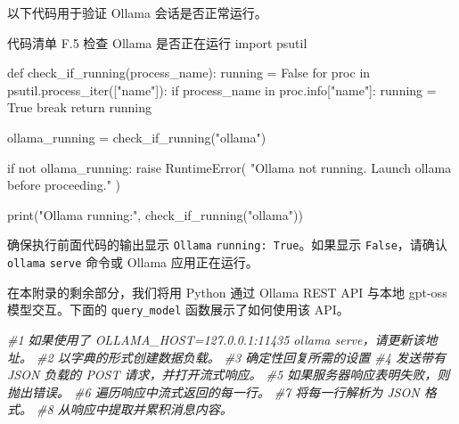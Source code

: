 以下代码用于验证 Ollama 会话是否正常运行。

\begin{codeboxt}{代码清单 F.5 检查 Ollama 是否正在运行}
import psutil

def check_if_running(process_name):
    running = False
    for proc in psutil.process_iter(["name"]):
        if process_name in proc.info["name"]:
            running = True
            break
    return running

ollama_running = check_if_running("ollama")

if not ollama_running:
    raise RuntimeError(
        "Ollama not running. Launch ollama before proceeding."
    )

print("Ollama running:", check_if_running("ollama"))
\end{codeboxt}

确保执行前面代码的输出显示 \texttt{Ollama} \texttt{running: True}。如果显示 \texttt{False}，请确认 \texttt{ollama} \texttt{serve} 命令或 Ollama 应用正在运行。

在本附录的剩余部分，我们将用 Python 通过 Ollama REST API 与本地 gpt-oss 模型交互。下面的 \texttt{query\_model} 函数展示了如何使用该 API。

{\noindent\small\textit{\#1 如果使用了 OLLAMA\_HOST=127.0.0.1:11435 ollama serve，请更新该地址。 \newline \#2 以字典的形式创建数据负载。 \newline \#3 确定性回复所需的设置 \newline \#4 发送带有 JSON 负载的 POST 请求，并打开流式响应。 \newline \#5 如果服务器响应表明失败，则抛出错误。 \newline \#6 遍历响应中流式返回的每一行。 \newline \#7 将每一行解析为 JSON 格式。 \newline \#8 从响应中提取并累积消息内容。}\par}

